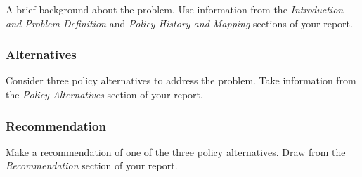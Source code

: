 A brief background about the problem. Use information from the
\emph{Introduction and Problem Definition} and \emph{Policy History and Mapping}
sections of your report.

\hypertarget{alternatives}{%
\subsubsection{Alternatives}\label{alternatives}}

Consider three policy alternatives to address the problem. Take
information from the \emph{Policy Alternatives} section of your report.

\hypertarget{recommendation}{%
\subsubsection{Recommendation}\label{recommendation}}

Make a recommendation of one of the three policy alternatives. Draw from
the \emph{Recommendation} section of your report.
